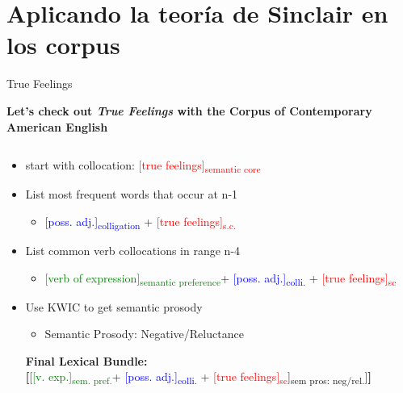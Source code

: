 \documentclass{beamer}
\begin{document}
\section{Aplicando la teoría de Sinclair en los corpus}

\begin{frame}{True Feelings}
	\begin{center}
    \textbf{Let's check out \textit{True Feelings} with the Corpus of Contemporary American English}
    \end{center}
    \begin{columns}
    	\begin{column}{15cm}
            \begin{itemize} 
            \pause
            \item start with collocation: \textcolor{red}{{[true feelings]}\textsubscript{semantic core}}
            \pause
            \item List most frequent words that occur at n-1
            	\begin{itemize}
                	\pause
                    \item \textcolor{blue}{{[poss. adj.]}\textsubscript{colligation}} + \textcolor{red}{{[true feelings]}\textsubscript{s.c.}}
            	\end{itemize}
            \pause
            \item List common verb collocations in range n-4
            	\begin{itemize}
                	\pause
                    \item \textcolor{green}{{[verb of expression]}\textsubscript{semantic preference}}+ \textcolor{blue}{{[poss. adj.]}\textsubscript{colli.}} + \textcolor{red}{{[true feelings]}\textsubscript{sc}}
            	\end{itemize}   
             \pause
             \item Use KWIC to get semantic prosody
             	\begin{itemize}
            		\pause
                    \item Semantic Prosody: Negative/Reluctance 
             	\end{itemize}
                \vspace{2em}
                \pause
                \textbf{Final Lexical Bundle:} \\
                	\textbf{{[}}{[\textcolor{green}{{[v. exp.]}\textsubscript{sem. pref.}}+ \textcolor{blue}{{[poss. adj.]}\textsubscript{colli.}} + \textcolor{red}{{[true feelings]}\textsubscript{sc}}]}\textsubscript{sem pros: neg/rel.}{]}\textbf{{]}}
            \end{itemize}
        \end{column}   
    \end{columns}
\end{frame}
\end{document}

